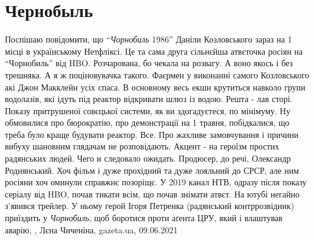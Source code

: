  
 
 
 
 
\chapter{Чернобыль}

Поспішаю повідомити, що \enquote{\emph{Чорнобиль} 1986} Даніли Козловського
зараз на 1 місці в українському Нетфліксі. Це та сама друга сільнєйша атвєточка
росіян на \enquote{Чорнобиль} від HBO.  Розчарована, бо чекала на розвагу. А
воно якось і без трешняка. А я ж поціновувачка такого. Фаєрмен у виконанні
самого Козловського акі Джон Макклейн усіх спаса. В основному весь екшн
крутиться навколо групи водолазів, які ідуть під реактор відкривати шлюз із
водою. Решта - лав сторі.  Показу притрушеної совєцької системи, як ви
здогадуєтеся, по мінімуму. Ну обмовилися про бюрократію, про демонстрації на 1
травня, побідкалися, що треба було краще будувати реактор. Все. Про жахливе
замовчування і причини вибуху шановним глядачам не розповідають. Акцент - на
героїзм простих радянських людей.  Чего и следовало ожидать. Продюсер, до речі,
Олександр Роднянський.  Хоч фільм і дуже прохідний та дуже лояльний до СРСР,
але ним росіяни хоч оминули справжнє позоріщє. У 2019 канал НТВ, одразу після
показу серіалу від HBO, почав тикати всім, що почав знімати атвєт. На ютубі
негайно з'явився трейлер. У ньому герой Ігоря Петренка (радянський
контррозвідник) приїздить у \emph{Чорнобиль}, щоб боротися проти аґента ЦРУ,
який і влаштував аварію,
, Лєна Чиченіна, gazeta.ua, 09.06.2021


